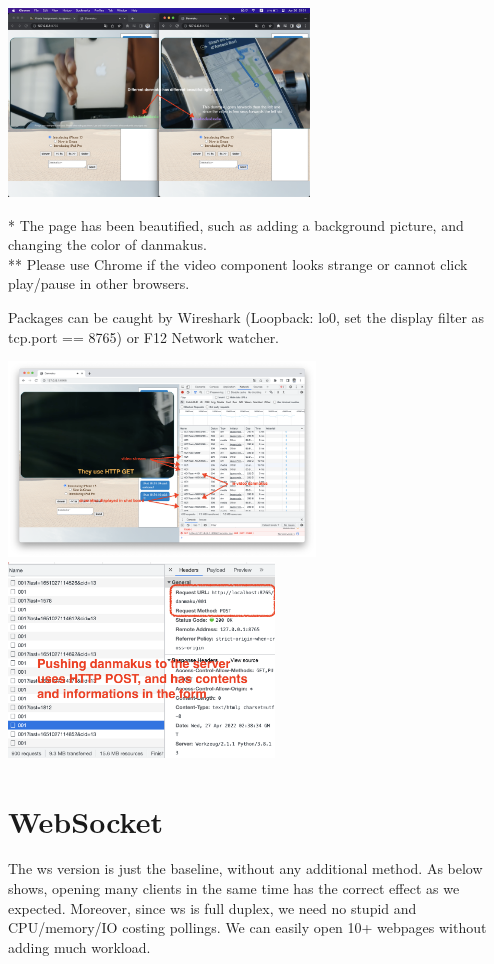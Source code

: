 \documentclass[onecolumn, oneside, ctexart]{SUSTechHomework}
\begin{document}
\centerline{\includegraphics[width=0.6\textwidth]{res/vid-mode}}

\noindent
* The page has been beautified, such as adding a background picture, and changing the color of danmakus.\\
** Please use Chrome if the video component looks strange or cannot click play/pause in other browsers.

\par Packages can be caught by Wireshark (Loopback: lo0, set the display filter as tcp.port == 8765) or F12 Network watcher.\\

\centerline{\includegraphics[height=14em]{res/http0}\quad
\includegraphics[height=14em]{res/http1}}

\section{WebSocket}
The ws version is just the baseline, without any additional method. As below shows, opening many clients in the same time has the correct effect as we expected. Moreover, since ws is full duplex, we need no stupid and CPU/memory/IO costing pollings. We can easily open 10+ webpages without adding much workload.\\
\end{document}
